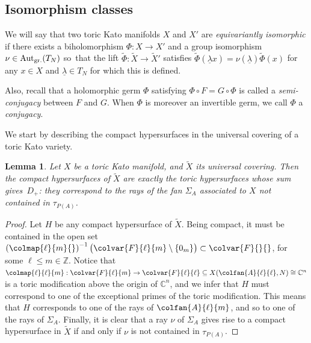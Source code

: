 \documentclass[JEP,XML,SOM,Unicode,NoFloatCountersInSection]{cedram}
\newtheorem{lemma}[theorem]{Lemma}
\theoremstyle{definition}
\let\wt\widetilde
\let\la\lambda
\let\sminus\setminus
\let\un\underline
\newcommand{\CC}{\mathbb{C}}
\newcommand{\ZZ}{\mathbb{Z}}
\DeclareMathOperator{\Aut}{Aut}
\begin{document}
\subsection{Isomorphism classes}

We will say that two toric Kato manifolds $X$ and $X'$ are \textit{equivariantly isomorphic} if there exists a biholomorphism $\Phi:X\to X'$ and a group isomorphism $\nu\in\Aut_{\textup{gr.}}(T_N)$ so~that the lift $\tilde\Phi:\tilde X\to \tilde X'$ satisfies $\tilde\Phi(\un\la x)=\nu(\un\la)\tilde\Phi(x)$ for any $x\in X$ and $\un\la\in T_N$ for which this is defined.

Also, recall that a holomorphic germ $\Phi$ satisfying $\Phi \circ F = G \circ \Phi$ is called a \emph{semi-conjugacy} between $F$ and $G$. When $\Phi$ is moreover an invertible germ,
we call $\Phi$ a \emph{conjugacy}.

We start by describing the compact hypersurfaces in the universal covering of a toric Kato variety.

\begin{lemma}\label{lem:compacthypersurfunivcover}
Let $X$ be a toric Kato manifold, and $\wt{X}$ its universal covering. Then the compact hypersurfaces of $\wt{X}$ are exactly the toric hypersurfaces whose sum gives~$D_+$: they correspond to the rays of the fan $\Sigma_A$ associated to $X$ not contained in $\tau_{P(A)}$.
\end{lemma}
\begin{proof}
Let $H$ be any compact hypersurface of $\wt{X}$.
Being compact, it must be contained in the open set $\left(\colmap{\ell}{m}{}\right)^{-1}\bigl(\colvar{F}{\ell}{m} \sminus \{0_m\}\bigr) \subset \colvar{F}{}{}$, for some $\ell \leq m \in \ZZ$. Notice that $\colmap{\ell}{\ell}{m}: \colvar{F}{\ell}{m} \to \colvar{F}{\ell}{\ell} \subseteq X(\colfan{A}{\ell}{\ell},N) \cong \CC^n$ is a toric modification above the origin of $\CC^n$, and we infer that $H$ must correspond to one of the exceptional primes of the toric modification.
This means that $H$ corresponds to one of the rays of $\colfan{A}{\ell}{m}$, and so to one of the rays of $\Sigma_A$. Finally, it is clear that a ray $\nu$ of $\Sigma_A$ gives rise to a compact hypersurface in $\tilde X$ if and only if $\nu$ is not contained in $\tau_{P(A)}$.
\end{proof}
\end{document}
